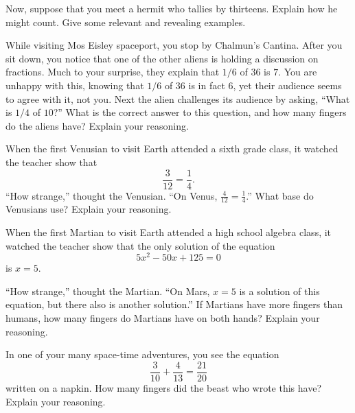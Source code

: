 \documentclass[nooutcomes]{ximera}
\begin{document}
\begin{problem}Now, suppose that you meet a hermit who tallies by
  thirteens. Explain how he might count. Give some relevant and
  revealing examples.
\end{problem} 

\begin{problem}While visiting Mos Eisley spaceport, you stop by Chalmun's
  Cantina. After you sit down, you notice that one of the other aliens
  is holding a discussion on fractions. Much to your surprise, they
  explain that $1/6$ of $36$ is $7$. You are unhappy with this,
  knowing that $1/6$ of $36$ is in fact $6$, yet their audience seems
  to agree with it, not you. Next the alien challenges its audience by
  asking, ``What is $1/4$ of $10$?'' What is the correct answer to
  this question, and how many fingers do the aliens have? Explain your
  reasoning.
\end{problem} 

\begin{problem}When the first Venusian to visit Earth attended a sixth grade
  class, it watched the teacher show that
\[
\frac{3}{12} = \frac{1}{4}.
\]
``How strange,'' thought the Venusian. ``On Venus, $\frac{4}{12} =
\frac{1}{4}$.'' What base do Venusians use? Explain your reasoning.
\end{problem} \begin{problem}When the first Martian to visit Earth attended a high school
  algebra class, it watched the teacher show that the only solution of
  the equation
\[
5x^2-50x+125 = 0
\]
is $x = 5$.

``How strange,'' thought the Martian. ``On Mars, $x = 5$ is a solution
of this equation, but there also is another solution.'' If Martians
have more fingers than humans, how many fingers do Martians have on both hands?
Explain your reasoning.


\end{problem} 

\begin{problem}In one of your many space-time adventures, you see the equation
\[
\frac{3}{10} + \frac{4}{13} = \frac{21}{20}
\]
written on a napkin. How many fingers did the beast who wrote this
have? Explain your reasoning.
\end{problem} 
\end{document}
